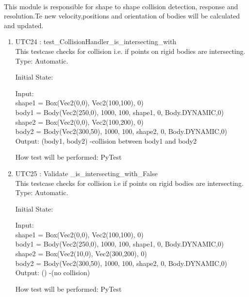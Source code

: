\documentclass[12pt, titlepage]{article}
\begin{document}
\paragraph{}
This module is responsible for shape to shape collision detection, response and resolution.Te new velocity,positions and orientation of bodies will be calculated and updated.
\begin{enumerate}
	
	
	\item{UTC24} {: test\_CollisionHandler\_is\_intersecting\_with\\}
This testcase checks for collision i.e. if points on rigid bodies are intersecting.\\	
	Type: Automatic.
	
	Initial State: 
	
	Input: \\
	shape1 = Box(Vec2(0,0), Vec2(100,100), 0)\\
	body1 = Body(Vec2(250,0), 1000, 100, shape1, 0, Body.DYNAMIC,0)\\
	shape2 = Box(Vec2(0,0), Vec2(100,200), 0)\\
	body2 = Body(Vec2(300,50), 1000, 100, shape2, 0, Body.DYNAMIC,0)\\
	
	Output: (body1, body2) -collision between body1 and body2
	
	How test will be performed: PyTest 
	
	\item{UTC25} {: Validate \_is\_intersecting\_with\_False \\}
	This testcase checks for collision i.e if points on rigid bodies are intersecting.\\	
	Type: Automatic.
	
	Initial State: 
	
	Input: \\
	shape1 = Box(Vec2(0,0), Vec2(100,100), 0)\\
	body1 =  Body(Vec2(250,0), 1000, 100, shape1, 0, Body.DYNAMIC,0)\\
	shape2 = Box(Vec2(10,0), Vec2(300,200), 0)\\
	body2 = Body(Vec2(300,50), 1000, 100, shape2, 0, Body.DYNAMIC,0)\\
	
	Output: () -(no collision)
	
	How test will be performed: PyTest 
	
	
	
\end{enumerate}
\end{document}
